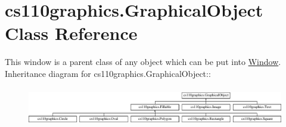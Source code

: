 \hypertarget{classcs110graphics_1_1GraphicalObject}{
\section{cs110graphics.GraphicalObject Class Reference}
\label{classcs110graphics_1_1GraphicalObject}
}


This window is a parent class of any object which can be put into \hyperlink{classcs110graphics_1_1Window}{Window}.  
Inheritance diagram for cs110graphics.GraphicalObject::\begin{figure}[H]
\begin{center}
\leavevmode
\includegraphics[height=1.68844cm]{classcs110graphics_1_1GraphicalObject}
\end{center}
\end{figure}
